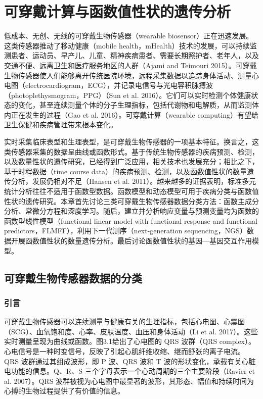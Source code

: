\chapter{可穿戴计算与函数值性状的遗传分析}
\label{ch:wearable-functional-traits}

低成本、无创、无线的可穿戴生物传感器（wearable biosensor）正在迅速发展。这类传感器推动了移动健康（mobile health，mHealth）技术的发展，可以持续监测患者、运动员、早产儿、儿童、精神疾病患者、需要长期照护者、老年人，以及交通不便、远离卫生和医疗服务地区的人群（Ajami and Teimouri 2015）。可穿戴生物传感器使人们能够离开传统医院环境，远程采集数据以追踪身体活动、测量心电图（electrocardiogram，ECG），并记录电信号与光电容积脉搏波（photoplethysmogram，PPG）（Sun et al. 2016）。它们可以实时检测个体健康状态的变化，甚至连续测量个体的分子生理指标，包括代谢物和电解质，从而监测体内正在发生的过程（Gao et al. 2016）。可穿戴计算（wearable computing）有望给卫生保健和疾病管理带来根本变化。

实时采集临床表型和生理表型，是可穿戴生物传感器的一项基本特征。换言之，这类传感器采集的数据呈曲线或函数形式。基于传统生物传感器的疾病预测、检测，以及数量性状的遗传研究，已经得到广泛应用，相关技术也发展充分；相比之下，基于时程数据（time course data）的疾病预测、检测，以及函数值性状的数量遗传分析，发展仍相对不足（Hansen et al. 2011）。越来越多的证据表明，标准多元统计分析往往不适用于函数型数据。函数模型和动态模型可用于疾病分类与函数值性状的遗传研究。本章首先讨论三类可穿戴生物传感器数据分类方法：函数主成分分析、常微分方程和深度学习。随后，建立并分析响应变量与预测变量均为函数的函数型线性模型（functional linear model with functional response and functional predictors，FLMFF），利用下一代测序（next-generation sequencing，NGS）数据开展函数值性状的数量遗传分析。最后讨论函数值性状的基因—基因交互作用模型。

\section{可穿戴生物传感器数据的分类}
\subsection{引言}

可穿戴生物传感器可以连续测量与健康有关的生理指标，包括心电图、心震图（SCG）、血氧饱和度、心率、皮肤温度、血压和身体活动（Li et al. 2017）。这些实时测量呈现为曲线或函数。图3.1给出了心电图的 QRS 波群（QRS complex）。心电信号是一种时变信号，反映了引起心肌纤维收缩、继而舒张的离子电流。QRS 波群通过其组成波形，即 P 波、QRS 波和 T 波的形状变化，承载有关心脏电功能的信息。Q、R、S 三个字母表示一个心动周期的三个主要阶段（Ravier et al. 2007）。QRS 波群被视为心电图中最显著的波形，其形态、幅值和持续时间为心搏的生物过程提供了有价值的信息。

